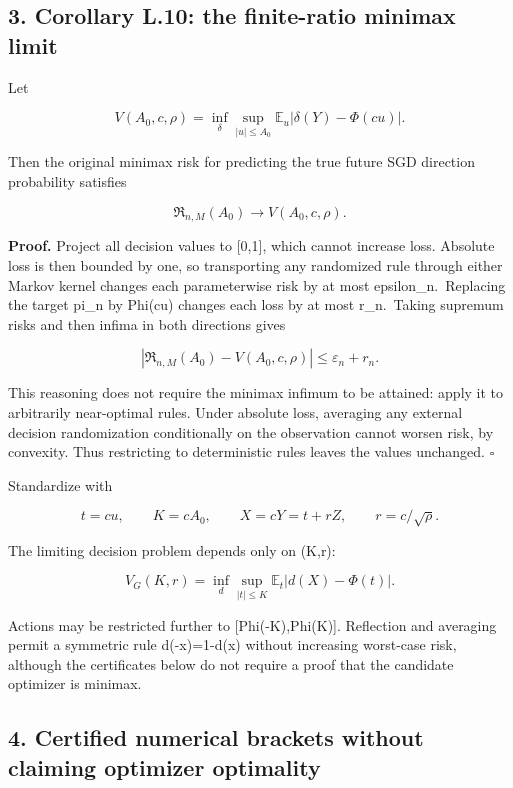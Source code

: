 \subsection{3. Corollary L.10: the finite-ratio minimax
limit}\label{gaussian_decision-corollary-l.10-the-finite-ratio-minimax-limit}

Let

\[
V(A_0,c,\rho)=\inf_\delta\sup_{|u|\le A_0}
 \mathbb E_u|\delta(Y)-\Phi(cu)|.
\]

Then the original minimax risk for predicting the true future SGD
direction probability satisfies

\[
\boxed{\mathfrak R_{n,M}(A_0)\longrightarrow V(A_0,c,\rho).}
\tag{G.6}
\]

\textbf{Proof.} Project all decision values to {[}0,1{]}, which cannot
increase loss. Absolute loss is then bounded by one, so transporting any
randomized rule through either Markov kernel changes each parameterwise
risk by at most epsilon\_n.~Replacing the target pi\_n by Phi(cu)
changes each loss by at most r\_n.~Taking supremum risks and then infima
in both directions gives

\[
|\mathfrak R_{n,M}(A_0)-V(A_0,c,\rho)|\le\varepsilon_n+r_n.
\]

This reasoning does not require the minimax infimum to be attained:
apply it to arbitrarily near-optimal rules. Under absolute loss,
averaging any external decision randomization conditionally on the
observation cannot worsen risk, by convexity. Thus restricting to
deterministic rules leaves the values unchanged. \(\square\)

Standardize with

\[
t=cu,\qquad K=cA_0,\qquad X=cY=t+rZ,\qquad r=c/\sqrt\rho.
\]

The limiting decision problem depends only on (K,r):

\[
V_G(K,r)=\inf_d\sup_{|t|\le K}\mathbb E_t|d(X)-\Phi(t)|.
\tag{G.7}
\]

Actions may be restricted further to {[}Phi(-K),Phi(K){]}. Reflection
and averaging permit a symmetric rule d(-x)=1-d(x) without increasing
worst-case risk, although the certificates below do not require a proof
that the candidate optimizer is minimax.

\subsection{4. Certified numerical brackets without claiming optimizer
optimality}\label{gaussian_decision-certified-numerical-brackets-without-claiming-optimizer-optimality}

